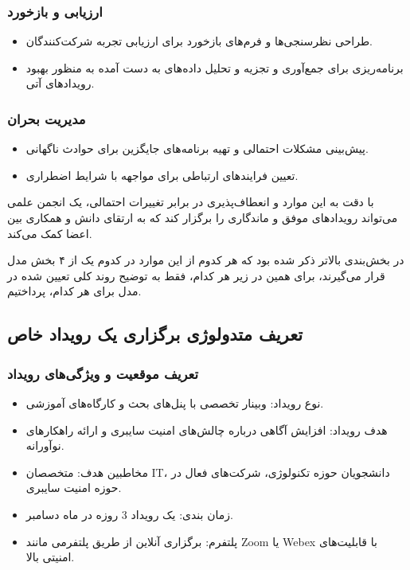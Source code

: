 \subsubsection*{ارزیابی و بازخورد}
\begin{itemize}
	\item طراحی نظرسنجی‌ها و فرم‌های بازخورد برای ارزیابی تجربه شرکت‌کنندگان.
	\item برنامه‌ریزی برای جمع‌آوری و تجزیه و تحلیل داده‌های به دست آمده به منظور بهبود رویدادهای آتی.
\end{itemize}

\subsubsection*{مدیریت بحران}
\begin{itemize}
	\item پیش‌بینی مشکلات احتمالی و تهیه برنامه‌های جایگزین برای حوادث ناگهانی.
	\item تعیین فرایندهای ارتباطی برای مواجهه با شرایط اضطراری. 
\end{itemize}

با دقت به این موارد و انعطاف‌پذیری در برابر تغییرات احتمالی، یک انجمن علمی می‌تواند رویدادهای موفق و ماندگاری را برگزار کند که به ارتقای دانش و همکاری بین اعضا کمک می‌کند.

در بخش‌بندی بالاتر ذکر شده بود که هر کدوم از این موارد در کدوم یک از ۴ بخش مدل قرار می‌گیرند، برای همین در زیر هر کدام، فقط به توضیح روند کلی تعیین شده در مدل برای هر کدام، پرداختیم.

\subsection*{تعریف متدولوژی برگزاری یک رویداد خاص}

\subsubsection*{تعریف موقعیت و ویژگی‌های رویداد}
\begin{itemize}
	\item نوع رویداد: وبینار تخصصی با پنل‌های بحث و کارگاه‌های آموزشی.
	\item هدف رویداد: افزایش آگاهی درباره چالش‌های امنیت سایبری و ارائه راهکارهای نوآورانه.
	\item مخاطبین هدف: متخصصان IT، دانشجویان حوزه تکنولوژی، شرکت‌های فعال در حوزه امنیت سایبری.
	\item زمان بندی: یک رویداد 3 روزه در ماه دسامبر.
	\item پلتفرم: برگزاری آنلاین از طریق پلتفرمی مانند Zoom یا Webex با قابلیت‌های امنیتی بالا.
\end{itemize}

